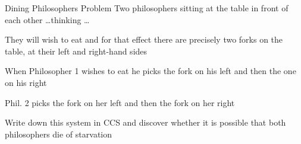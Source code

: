 \documentclass{beamer}
\begin{document}
\begin{frame}{Dining Philosophers Problem}
  Two philosophers sitting at the table in front of each other \dots thinking
  \dots

  They will wish to eat and for that effect there are precisely \alert{two
  forks} on the table, at their left and right-hand sides

  When Philosopher 1 wishes to eat he picks the fork on his left and then the
  one on his right

  Phil. 2 picks the fork on her left and then the fork on her right

  \vfill
  Write down this system in CCS and discover whether it is possible that both philosophers
  die of starvation
\end{frame}
%
%
%
%
%
%
%
%
%  
%
%
%
%
\end{document}
